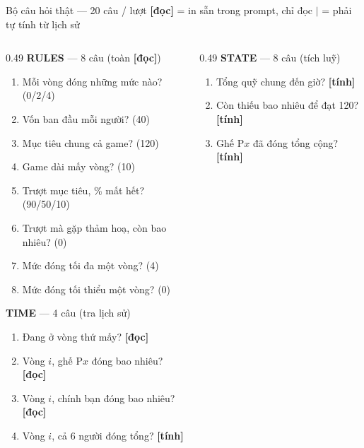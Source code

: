 \documentclass[aspectratio=169,10pt]{beamer}
\newcommand{\rd}{{\footnotesize\textcolor{green!45!black}{\textbf{[đọc]}}}}
\newcommand{\sm}{{\footnotesize\textcolor{orange!80!black}{\textbf{[tính]}}}}
\begin{document}
\begin{frame}{Bộ câu hỏi thật --- 20 câu / lượt}
  {\footnotesize \rd{} = in sẵn trong prompt, chỉ đọc \quad$\vert$\quad \sm{} = phải tự tính từ lịch sử}
  \smallskip
  \begin{columns}[T]
    \begin{column}{0.49\textwidth}
      {\scriptsize\color{green!45!black}\textbf{RULES} --- 8 câu (toàn \rd)}\par
      {\scriptsize
      \begin{enumerate}\setlength\itemsep{0.5pt}
        \item Mỗi vòng đóng những mức nào? \;(0/2/4)
        \item Vốn ban đầu mỗi người? \;(40)
        \item Mục tiêu chung cả game? \;(120)
        \item Game dài mấy vòng? \;(10)
        \item Trượt mục tiêu, \% mất hết? \;(90/50/10)
        \item Trượt mà gặp thảm hoạ, còn bao nhiêu? \;(0)
        \item Mức đóng tối đa một vòng? \;(4)
        \item Mức đóng tối thiểu một vòng? \;(0)
      \end{enumerate}}
      \smallskip
      {\scriptsize\color{green!45!black}\textbf{TIME} --- 4 câu (tra lịch sử)}\par
      {\scriptsize
      \begin{enumerate}\setlength\itemsep{0.5pt}\setcounter{enumi}{8}
        \item Đang ở vòng thứ mấy? \rd
        \item Vòng $i$, ghế P$x$ đóng bao nhiêu? \rd
        \item Vòng $i$, chính bạn đóng bao nhiêu? \rd
        \item Vòng $i$, cả 6 người đóng tổng? \sm
      \end{enumerate}}
    \end{column}
    \begin{column}{0.49\textwidth}
      {\scriptsize\color{green!45!black}\textbf{STATE} --- 8 câu (tích luỹ)}\par
      {\scriptsize
      \begin{enumerate}\setlength\itemsep{0.5pt}\setcounter{enumi}{12}
        \item Tổng quỹ chung đến giờ? \sm
        \item Còn thiếu bao nhiêu để đạt 120? \sm
        \item Ghế P$x$ đã đóng tổng cộng? \sm

\end{enumerate}}
\end{column}
\end{columns}
\end{frame}
\end{document}

